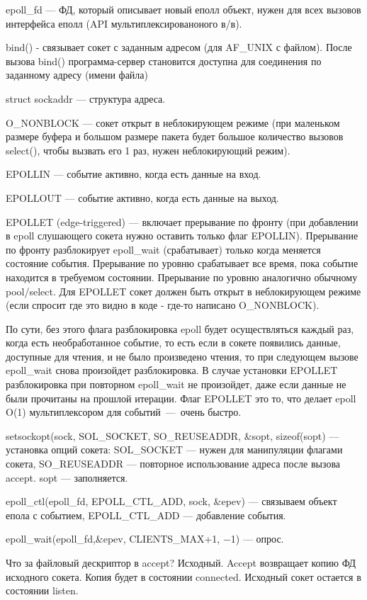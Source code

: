 epoll\_fd --- ФД, который описывает новый еполл объект, нужен для всех вызовов интерфейса еполл (API мультиплексированоного в/в).

bind() - связывает сокет с заданным адресом (для AF\_UNIX с файлом). После вызова bind() программа-сервер становится доступна для соединения по заданному адресу (имени файла)

struct sockaddr --- структура адреса.

O\_NONBLOCK --- сокет открыт в неблокирующем режиме (при маленьком размере буфера и большом размере пакета будет большое количество вызовов select(), чтобы вызвать его 1 раз, нужен неблокирующий режим).

EPOLLIN — событие активно, когда есть данные на вход. 

EPOLLOUT — событие активно, когда есть данные на выход. 

EPOLLET (edge-triggered) — включает прерывание по фронту (при добавлении в epoll слушающего сокета нужно оставить только флаг EPOLLIN). Прерывание по фронту разблокирует epoll\_wait (срабатывает) только когда меняется состояние события. Прерывание по уровню срабатывает все время, пока событие находится в требуемом состоянии. Прерывание по уровню аналогично обычному pool/select. Для EPOLLET сокет должен быть открыт в неблокирующем режиме (если спросит где это видно в коде - где-то написано O\_NONBLOCK). 

По сути, без этого флага разблокировка epoll будет осуществляться каждый раз, когда есть необработанное событие, то есть если в сокете появились данные, доступные для чтения, и не было произведено чтения, то при следующем вызове epoll\_wait снова произойдет разблокировка. В случае установки EPOLLET разблокировка при повторном epoll\_wait не произойдет, даже если данные не были прочитаны на прошлой итерации. Флаг EPOLLET это то, что делает epoll O(1) мультиплексором для событий~---~очень быстро.

setsockopt(sock, SOL\_SOCKET, SO\_REUSEADDR, \&sopt, sizeof(sopt) --- установка опций сокета: SOL\_SOCKET --- нужен для манипуляции флагами сокета, SO\_REUSEADDR --- повторное использование адреса после вызова accept. sopt --- заполняется.

epoll\_ctl(epoll\_fd, EPOLL\_CTL\_ADD, sock, \&epev) --- связываем объект епола с событием, EPOLL\_CTL\_ADD --- добавление события.

epoll\_wait(epoll\_fd,\&epev, CLIENTS\_MAX+1, −1) --- опрос.

Что за файловый дескриптор в accept? Исходный. Accept возвращает копию ФД исходного сокета. Копия будет в состоянии connected. Исходный сокет остается в состоянии listen.

